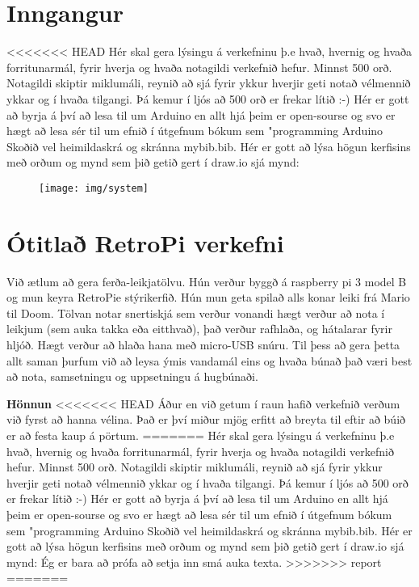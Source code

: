 \section{Inngangur}
<<<<<<< HEAD
Hér skal gera lýsingu á verkefninu þ.e hvað,  hvernig og  hvaða forritunarmál, fyrir hverja og hvaða notagildi verkefnið hefur. Minnst 500 orð. Notagildi skiptir miklumáli, reynið að sjá fyrir ykkur hverjir geti notað vélmennið ykkar og í hvaða tilgangi.  Þá kemur í ljós að 500 orð er frekar lítið :-) Hér er gott að byrja á því að lesa til um Arduino en allt hjá þeim er open-sourse og svo er hægt að lesa sér til um efnið í útgefnum bókum sem "programming Arduino \cite{monk} Skoðið vel heimildaskrá og skránna mybib.bib. Hér er gott að lýsa högun kerfisins með orðum og mynd sem þið getið gert í draw.io sjá mynd:

\begin{figure}[h]
\texttt{[image: img/system]}
\end{figure}
\section{Ótitlað RetroPi verkefni}
Við ætlum að gera ferða-leikjatölvu. Hún verður byggð á raspberry pi 3 model B og mun keyra RetroPie stýrikerfið. Hún mun geta spilað alls konar leiki frá Mario til Doom. Tölvan notar snertiskjá sem verður vonandi hægt verður að nota í leikjum (sem auka takka eða eitthvað), það verður rafhlaða, og hátalarar fyrir hljóð. Hægt verður að hlaða hana með micro-USB snúru. Til þess að gera þetta allt saman þurfum við að leysa ýmis vandamál eins og hvaða búnað það væri best að nota, samsetningu og uppsetningu á hugbúnaði.

\textbf{Hönnun}
<<<<<<< HEAD
Áður en við getum í raun hafið verkefnið verðum við fyrst að hanna vélina. Það er því miður mjög erfitt að breyta til eftir að búið er að festa kaup á pörtum.
=======
Hér skal gera lýsingu á verkefninu þ.e hvað,  hvernig og  hvaða forritunarmál, fyrir hverja og hvaða notagildi verkefnið hefur. Minnst 500 orð. Notagildi skiptir miklumáli, reynið að sjá fyrir ykkur hverjir geti notað vélmennið ykkar og í hvaða tilgangi.  Þá kemur í ljós að 500 orð er frekar lítið :-) Hér er gott að byrja á því að lesa til um Arduino en allt hjá þeim er open-sourse og svo er hægt að lesa sér til um efnið í útgefnum bókum sem "programming Arduino \cite{monk} Skoðið vel heimildaskrá og skránna mybib.bib. Hér er gott að lýsa högun kerfisins með orðum og mynd sem þið getið gert í draw.io sjá mynd: Ég er bara að prófa að setja inn smá auka texta.
>>>>>>> report
=======


